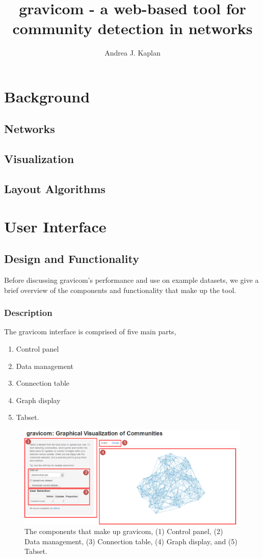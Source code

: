\documentclass{article}\usepackage[]{graphicx}\usepackage[]{color}
\title{gravicom - a web-based tool for community detection in networks}
\author{Andrea J. Kaplan}
\begin{document}
\maketitle
\section{Background}
\subsection{Networks}
\subsection{Visualization}
\subsection{Layout Algorithms}

\section{User Interface}
\subsection{Design and Functionality}

Before discussing gravicom's performance and use on example datasets, we give a brief overview of the components and functionality that make up the tool.



\subsubsection{Description}

The gravicom interface is comprised of five main parts,
\begin{enumerate}
\item Control panel
\item Data management
\item Connection table 
\item Graph display
\item Tabset.
\end{enumerate}

\begin{figure}[H]
\centering
\includegraphics[width=\textwidth]{images/sitecomponents.png}
\caption{\label{fig:sitecomponents} The components that make up gravicom, (1) Control panel, (2) Data management, (3) Connection table, (4) Graph display, and (5) Tabset.}
\end{figure}
\end{document}
